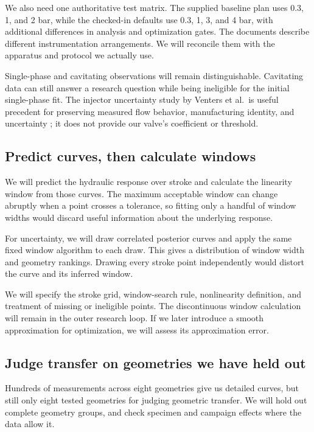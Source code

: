We also need one authoritative test matrix. The supplied baseline plan uses 0.3, 1, and 2 bar, while the checked-in defaults use 0.3, 1, 3, and 4 bar, with additional differences in analysis and optimization gates. The documents describe different instrumentation arrangements. We will reconcile them with the apparatus and protocol we actually use.

Single-phase and cavitating observations will remain distinguishable. Cavitating data can still answer a research question while being ineligible for the initial single-phase fit. The injector uncertainty study by Venters et al.\ is useful precedent for preserving measured flow behavior, manufacturing identity, and uncertainty \cite{venters2019}; it does not provide our valve's coefficient or threshold.

\subsection{Predict curves, then calculate windows}

We will predict the hydraulic response over stroke and calculate the linearity window from those curves. The maximum acceptable window can change abruptly when a point crosses a tolerance, so fitting only a handful of window widths would discard useful information about the underlying response.

For uncertainty, we will draw correlated posterior curves and apply the same fixed window algorithm to each draw. This gives a distribution of window width and geometry rankings. Drawing every stroke point independently would distort the curve and its inferred window.

We will specify the stroke grid, window-search rule, nonlinearity definition, and treatment of missing or ineligible points. The discontinuous window calculation will remain in the outer research loop. If we later introduce a smooth approximation for optimization, we will assess its approximation error.

\subsection{Judge transfer on geometries we have held out}

Hundreds of measurements across eight geometries give us detailed curves, but still only eight tested geometries for judging geometric transfer. We will hold out complete geometry groups, and check specimen and campaign effects where the data allow it.

